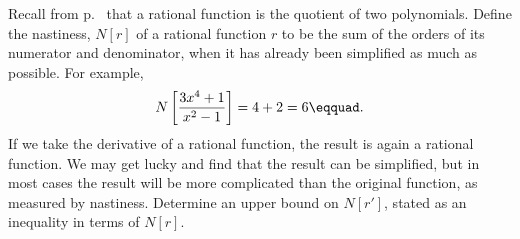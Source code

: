 Recall from p.~\pageref{rational-function-defined} that a rational function is
the quotient of two polynomials. Define the nastiness, $N[r]$ of a rational
function $r$ to be the sum of the orders of its numerator and denominator,
when it has already been simplified as much as possible. For example,
\begin{equation*}
  N\left[\frac{3x^4+1}{x^2-1}\right] = 4+2=6\eqquad.
\end{equation*}
If we take the derivative of a rational function, the result is again
a rational function. We may get lucky and
find that the result can be simplified, but in most cases the result will
be more complicated than the original function, as measured by nastiness.
Determine an upper bound on $N[r']$, stated as an inequality in terms of
$N[r]$.
